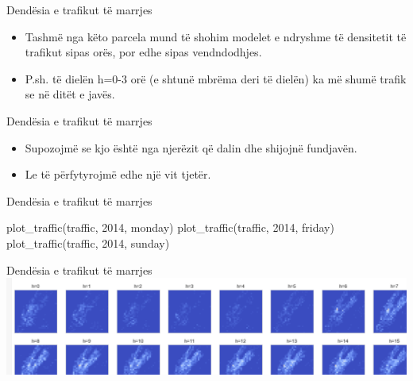\documentclass[
  ignorenonframetext,
]{beamer}
\newenvironment{Shaded}{\begin{snugshade}}{\end{snugshade}}
\newcommand{\DecValTok}[1]{\textcolor[rgb]{0.00,0.00,0.81}{#1}}
\newcommand{\NormalTok}[1]{#1}
\newcommand{\StringTok}[1]{\textcolor[rgb]{0.31,0.60,0.02}{#1}}
\begin{document}
\begin{frame}{Dendësia e trafikut të marrjes}
\protect\hypertarget{denduxebsia-e-trafikut-tuxeb-marrjes-8}{}
\begin{itemize}
\item
  Tashmë nga këto parcela mund të shohim modelet e ndryshme të
  densitetit të trafikut sipas orës, por edhe sipas vendndodhjes.
\item
  P.sh. të dielën h=0-3 orë (e shtunë mbrëma deri të dielën) ka më shumë
  trafik se në ditët e javës.
\end{itemize}
\end{frame}

\begin{frame}{Dendësia e trafikut të marrjes}
\protect\hypertarget{denduxebsia-e-trafikut-tuxeb-marrjes-9}{}
\begin{itemize}
\item
  Supozojmë se kjo është nga njerëzit që dalin dhe shijojnë fundjavën.
\item
  Le të përfytyrojmë edhe një vit tjetër.
\end{itemize}
\end{frame}

\begin{frame}[fragile]{Dendësia e trafikut të marrjes}
\protect\hypertarget{denduxebsia-e-trafikut-tuxeb-marrjes-10}{}

\begin{Shaded}
\begin{Highlighting}[]
\NormalTok{plot\_traffic(traffic, }\DecValTok{2014}\NormalTok{, }\StringTok{\textquotesingle{}monday\textquotesingle{}}\NormalTok{)}
\NormalTok{plot\_traffic(traffic, }\DecValTok{2014}\NormalTok{, }\StringTok{\textquotesingle{}friday\textquotesingle{}}\NormalTok{)}
\NormalTok{plot\_traffic(traffic, }\DecValTok{2014}\NormalTok{, }\StringTok{\textquotesingle{}sunday\textquotesingle{}}\NormalTok{)}
\end{Highlighting}
\end{Shaded}
\end{frame}

\begin{frame}{Dendësia e trafikut të marrjes}
\protect\hypertarget{denduxebsia-e-trafikut-tuxeb-marrjes-11}{}
\includegraphics{./Figs/train20.png}
\end{frame}
\end{document}
